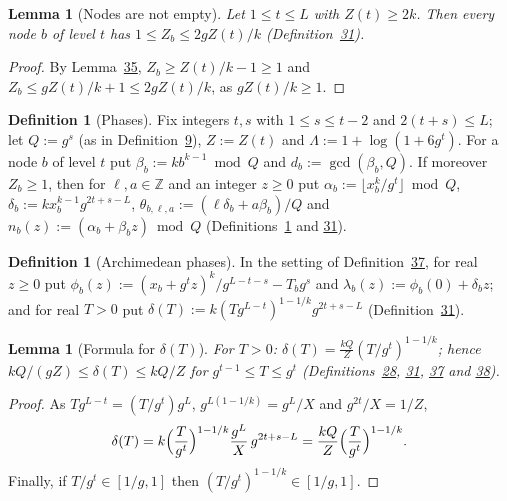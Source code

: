 \documentclass[11pt]{article}
\newcounter{hffc}
\theoremstyle{definition}\newtheorem{hffdef}[hffc]{Definition}
\theoremstyle{plain}\newtheorem{hfflem}[hffc]{Lemma}\newtheorem{hffthm}[hffc]{Theorem}
\theoremstyle{remark}\newtheorem{hffrem}[hffc]{Remark}
\newcommand{\hffcost}{}
\newcommand{\setcost}[1]{\renewcommand{\hffcost}{#1}}
\newcommand{\Z}{\mathbb{Z}}\newcommand{\R}{\mathbb{R}}\newcommand{\N}{\mathbb{N}}
\begin{document}
\begin{hfflem}[Nodes are not empty]\label{L:nonempty}
Let $1\le t\le L$ with $Z(t)\ge2k$. Then every node $b$ of level $t$ has $1\le Z_b\le2gZ(t)/k$ (Definition~\hyperref[D:node]{31}).
\par\nopagebreak{}
\end{hfflem}
\begin{proof}\setcost{length 60/300}By Lemma~\hyperref[L:sizes]{35}, $Z_b\ge Z(t)/k-1\ge1$ and $Z_b\le gZ(t)/k+1\le2gZ(t)/k$, as $gZ(t)/k\ge1$.
\end{proof}

\begin{hffdef}[Phases]\label{D:phase}
Fix integers $t,s$ with $1\le s\le t-2$ and $2(t+s)\le L$; let $Q:=g^s$ (as in Definition~\hyperref[D:psi]{9}), $Z:=Z(t)$ and $\Lambda:=1+\log(1+6g^t)$. For a node $b$ of level $t$ put $\beta_b:=kb^{k-1}\bmod Q$ and $d_b:=\gcd(\beta_b,Q)$. If moreover $Z_b\ge1$, then for $\ell,a\in\Z$ and an integer $z\ge0$ put $\alpha_b:=\lfloor x_b^k/g^t\rfloor\bmod Q$, $\delta_b:=kx_b^{k-1}g^{2t+s-L}$, $\theta_{b,\ell,a}:=(\ell\delta_b+a\beta_b)/Q$ and $n_b(z):=(\alpha_b+\beta_bz)\bmod Q$ (Definitions~\hyperref[D:conv]{1} and \hyperref[D:node]{31}).
\par\nopagebreak{}
\end{hffdef}

\begin{hffdef}[Archimedean phases]\label{D:arch}
In the setting of Definition~\hyperref[D:phase]{37}, for real $z\ge0$ put $\phi_b(z):=(x_b+g^tz)^k/g^{L-t-s}-T_bg^s$ and $\lambda_b(z):=\phi_b(0)+\delta_bz$; and for real $T>0$ put $\delta(T):=k(Tg^{L-t})^{1-1/k}g^{2t+s-L}$ (Definition~\hyperref[D:node]{31}).
\par\nopagebreak{}
\end{hffdef}

\begin{hfflem}[Formula for $\delta(T)$]\label{L:delta}
For $T>0$: $\delta(T)=\frac{kQ}Z(T/g^t)^{1-1/k}$; hence $kQ/(gZ)\le\delta(T)\le kQ/Z$ for $g^{t-1}\le T\le g^t$ (Definitions~\hyperref[D:pal]{28}, \hyperref[D:node]{31}, \hyperref[D:phase]{37} and \hyperref[D:arch]{38}).
\par\nopagebreak{}
\end{hfflem}
\begin{proof}\setcost{length 127/300}As $Tg^{L-t}=(T/g^t)g^L$, $g^{L(1-1/k)}=g^L/X$ and $g^{2t}/X=1/Z$, \[\delta(T)=k\Bigl(\frac T{g^t}\Bigr)^{1-1/k}\frac{g^L}X\,g^{2t+s-L}=\frac{kQ}Z\Bigl(\frac T{g^t}\Bigr)^{1-1/k}.\] Finally, if $T/g^t\in[1/g,1]$ then $(T/g^t)^{1-1/k}\in[1/g,1]$.
\end{proof}
\end{document}
